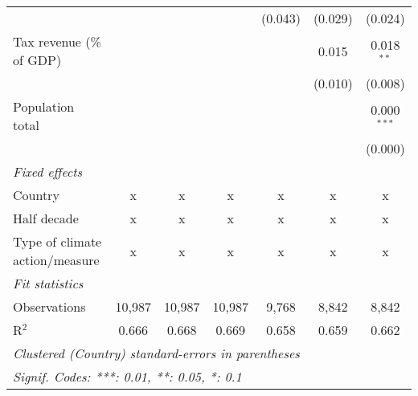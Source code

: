 \begin{tabular}{lcccccc}
                                                      &         &               &                & (0.043)        & (0.029)        & (0.024)\\   
   Tax revenue (\% of GDP)                            &         &               &                &                & 0.015          & 0.018$^{**}$\\   
                                                      &         &               &                &                & (0.010)        & (0.008)\\   
   Population total                                   &         &               &                &                &                & 0.000$^{***}$\\   
                                                      &         &               &                &                &                & (0.000)\\   
   \emph{Fixed effects}\\
   Country                                            & x       & x             & x              & x              & x              & x\\  
   Half decade                                        & x       & x             & x              & x              & x              & x\\  
   Type of climate action/measure                     & x       & x             & x              & x              & x              & x\\  
   \midrule \emph{Fit statistics}\\
   Observations                                       & 10,987  & 10,987        & 10,987         & 9,768          & 8,842          & 8,842\\  
   R$^2$                                              & 0.666   & 0.668         & 0.669          & 0.658          & 0.659          & 0.662\\  
   \midrule
   \multicolumn{7}{l}{\emph{Clustered (Country) standard-errors in parentheses}}\\
   \multicolumn{7}{l}{\emph{Signif. Codes: ***: 0.01, **: 0.05, *: 0.1}}\\
\end{tabular}
\par\endgroup


